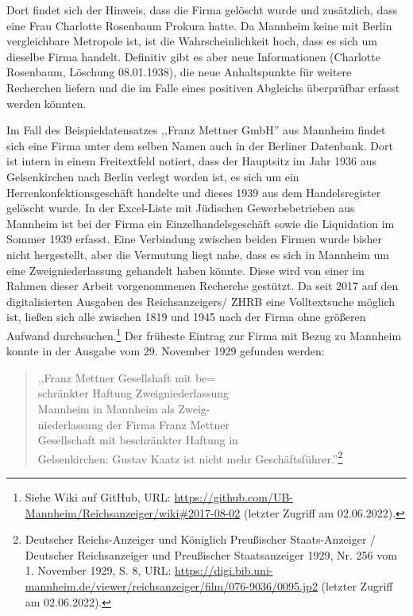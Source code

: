 Dort findet sich der Hinweis, dass die Firma gelöscht wurde und zusätzlich, dass eine Frau Charlotte Rosenbaum Prokura hatte. Da Mannheim keine mit Berlin vergleichbare Metropole ist, ist die Wahrscheinlichkeit hoch, dass es sich um dieselbe Firma handelt. Definitiv gibt es aber neue Informationen (Charlotte Rosenbaum, Löschung 08.01.1938), die neue Anhaltspunkte für weitere Recherchen liefern und die im Falle eines positiven Abgleichs überprüfbar erfasst werden könnten. 

Im Fall des Beispieldatensatzes ,,Franz Mettner GmbH'' aus Mannheim findet sich eine Firma unter dem selben Namen auch in der Berliner Datenbank. Dort ist intern in einem Freitextfeld notiert, dass der Hauptsitz im Jahr 1936 aus Gelsenkirchen nach Berlin verlegt worden ist, es sich um ein Herrenkonfektionsgeschäft handelte und dieses 1939 aus dem Handelsregister gelöscht wurde. In der Excel-Liste mit Jüdischen Gewerbebetrieben aus Mannheim ist bei der Firma ein Einzelhandelsgeschäft sowie die Liquidation im Sommer 1939 erfasst. Eine Verbindung zwischen beiden Firmen wurde bisher nicht hergestellt, aber die Vermutung liegt nahe, dass es sich in Mannheim um eine Zweigniederlassung gehandelt haben könnte. Diese wird von einer im Rahmen dieser Arbeit vorgenommenen Recherche gestützt. Da seit 2017 auf den digitalisierten Ausgaben des Reichsanzeigers/ ZHRB eine Volltextsuche möglich ist, ließen sich alle zwischen 1819 und 1945 nach der Firma ohne größeren Aufwand durchsuchen.\footnote{Siehe Wiki auf GitHub, URL: \url{https://github.com/UB-Mannheim/Reichsanzeiger/wiki\#2017-08-02} (letzter Zugriff am 02.06.2022).} Der früheste Eintrag zur Firma mit Bezug zu Mannheim konnte in der Ausgabe vom 29. November 1929 gefunden werden: 

\begin{quote}
    ,,Franz Mettner Gesellshaft mit be= \\
    schränkter Haftung Zweigniederlassung \\
    Mannheim in Mannheim als Zweig- \\
    niederlassung der Firma Franz Mettner \\
    Gesellschaft mit beschränkter Haftung in \\
    Gelsenkirchen: Gustav Kaatz ist nicht mehr Geschäftsführer.''\footnote{Deutscher Reichs-Anzeiger und Königlich Preußischer Staats-Anzeiger / Deutscher Reichsanzeiger und Preußischer Staatsanzeiger 1929, Nr. 256 vom 1. November 1929, S. 8, URL: \url{https://digi.bib.uni-mannheim.de/viewer/reichsanzeiger/film/076-9036/0095.jp2} (letzter Zugriff am 02.06.2022).}
\end{quote}

